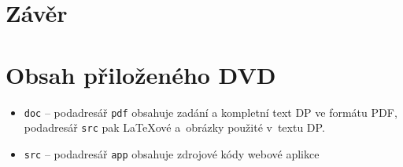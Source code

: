 \documentclass[a4paper,11pt,titlepage,fleqn]{article}
\begin{document}
\newpage
\section{Závěr}

\newpage
\begin{thebibliography}{99}



\end{thebibliography}

\newpage
\section*{Obsah přiloženého DVD}

\begin{figure}[ht!] 
\end{figure}

\begin{itemize}
    \item {\texttt{doc} -- podadresář \texttt{pdf} obsahuje zadání a kompletní text DP ve formátu PDF,
    podadresář \verb|src| pak {\LaTeX}ové  a~obrázky použité
    v~textu DP.}
    \item {\texttt{src} -- podadresář \texttt{app} obsahuje zdrojové kódy webové aplikce}
\end{itemize}
\end{document}
